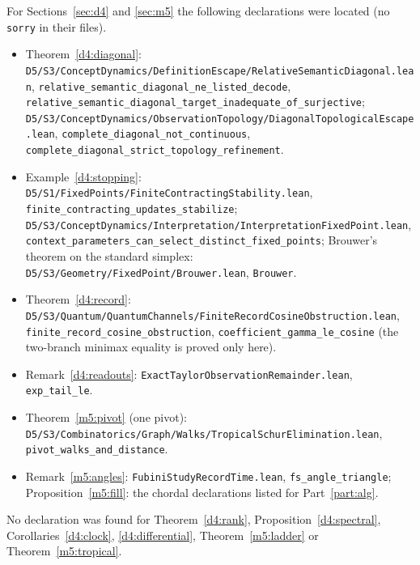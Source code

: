 \documentclass[11pt,reqno]{amsart}
\theoremstyle{definition}
\theoremstyle{remark}
\numberwithin{equation}{section}
\begin{document}
For Sections~\ref{sec:d4} and \ref{sec:m5} the following declarations were located (no \texttt{sorry} in their files).
{\small\raggedright
\begin{itemize}[leftmargin=1.5em]
\item Theorem~\ref{d4:diagonal}: \texttt{D5/S3/ConceptDynamics/DefinitionEscape/RelativeSemanticDiagonal.lean},
\texttt{relative\_semantic\_diagonal\_ne\_listed\_decode}, \texttt{relative\_semantic\_diagonal\_target\_inadequate\_of\_surjective};
\texttt{D5/S3/ConceptDynamics/ObservationTopology/DiagonalTopologicalEscape.lean}, \texttt{complete\_diagonal\_not\_continuous},
\texttt{complete\_diagonal\_strict\_topology\_refinement}.
\item Example~\ref{d4:stopping}: \texttt{D5/S1/FixedPoints/FiniteContractingStability.lean}, \texttt{finite\_contracting\_updates\_stabilize};
\texttt{D5/S3/ConceptDynamics/Interpretation/InterpretationFixedPoint.lean}, \texttt{context\_parameters\_can\_select\_distinct\_fixed\_points};
Brouwer's theorem on the standard simplex: \texttt{D5/S3/Geometry/FixedPoint/Brouwer.lean}, \texttt{Brouwer}.
\item Theorem~\ref{d4:record}: \texttt{D5/S3/Quantum/QuantumChannels/FiniteRecordCosineObstruction.lean}, \texttt{finite\_record\_cosine\_obstruction},
\texttt{coefficient\_gamma\_le\_cosine} (the two-branch minimax equality is proved only here).
\item Remark~\ref{d4:readouts}: \texttt{ExactTaylorObservationRemainder.lean}, \texttt{exp\_tail\_le}.
\item Theorem~\ref{m5:pivot} (one pivot): \texttt{D5/S3/Combinatorics/Graph/Walks/TropicalSchurElimination.lean}, \texttt{pivot\_walks\_and\_distance}.
\item Remark~\ref{m5:angles}: \texttt{FubiniStudyRecordTime.lean}, \texttt{fs\_angle\_triangle}; Proposition~\ref{m5:fill}: the chordal declarations listed for
Part~\ref{part:alg}.
\end{itemize}}
No declaration was found for Theorem~\ref{d4:rank}, Proposition~\ref{d4:spectral}, Corollaries~\ref{d4:clock}, \ref{d4:differential},
Theorem~\ref{m5:ladder} or Theorem~\ref{m5:tropical}.
\end{document}
